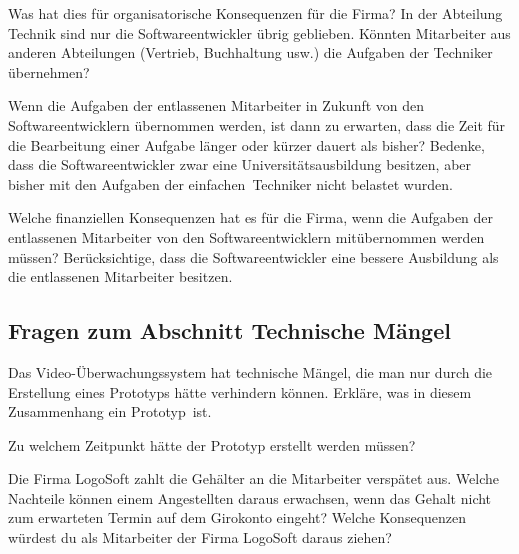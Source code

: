 \begin{compactenum}[a)]
\item Was hat dies für organisatorische Konsequenzen für die Firma? In der
Abteilung Technik sind nur die Softwareentwickler übrig geblieben. Könnten
Mitarbeiter aus anderen Abteilungen (Vertrieb, Buchhaltung usw.) die Aufgaben
der Techniker übernehmen? 
\item Wenn die Aufgaben der entlassenen Mitarbeiter in Zukunft von den
Softwareentwicklern übernommen werden, ist dann zu erwarten, dass die Zeit für
die Bearbeitung einer Aufgabe länger oder kürzer dauert als bisher? Bedenke,
dass die Softwareentwickler zwar eine Universitätsausbildung besitzen, aber
bisher mit den Aufgaben der \glqq einfachen\grqq\ Techniker nicht belastet
wurden.
\item Welche finanziellen Konsequenzen hat es für die Firma, wenn die Aufgaben
der entlassenen Mitarbeiter von den Softwareentwicklern mitübernommen werden
müssen? Berücksichtige, dass die Softwareentwickler eine bessere Ausbildung als
die entlassenen Mitarbeiter besitzen.
\end{compactenum}

\subsection*{Fragen zum Abschnitt \glqq Technische Mängel\grqq}
\begin{compactenum}[a)]
\item Das Video-Überwachungssystem hat technische Mängel, die man nur durch die
Erstellung eines Prototyps hätte verhindern können. Erkläre, was in diesem
Zusammenhang ein \glqq Prototyp\grqq\ ist.
\item Zu welchem Zeitpunkt hätte der Prototyp erstellt werden müssen? 
\item Die Firma LogoSoft zahlt die Gehälter an die Mitarbeiter verspätet aus.
Welche Nachteile können einem Angestellten daraus erwachsen, wenn das Gehalt
nicht zum erwarteten Termin auf dem Girokonto eingeht? Welche Konsequenzen
würdest du als Mitarbeiter der Firma LogoSoft daraus ziehen?
\end{compactenum}

